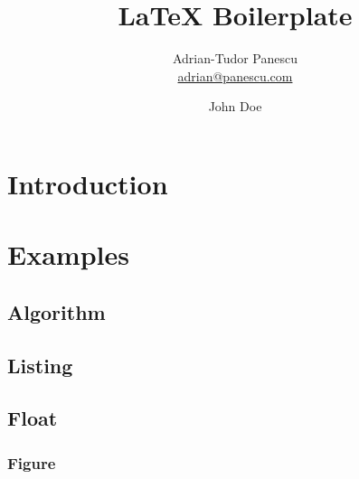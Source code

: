 \documentclass[12pt,a4paper,twoside]{report}
\author{
    Adrian-Tudor Panescu \\
    \href{mailto:adrian@panescu.com}{adrian@panescu.com}
  \and
    John Doe
}
\title{LaTeX Boilerplate}
\date{}  %
\begin{document}
  

  

  \setcounter{page}{3}

  \begin{abstract}
    
  \end{abstract}

  \tableofcontents
  \listoffigures
  \listoftables
  \lstlistoflistings

  \cleardoublepage

  \section{Introduction}
    \label{sec:intro}
    

  \cleardoublepage

  \section{Examples}
    \label{sec:ex}
    

    \FloatBarrier

    \subsection{Algorithm}
      \label{sec:algo}
      

    \clearpage

    \subsection{Listing}
      \label{sec:lst}
      

    \clearpage

    \subsection{Float}
      \label{sec:float}
      

      \FloatBarrier

      \subsubsection{Figure}
        \label{sec:fig}
        
\end{document}
